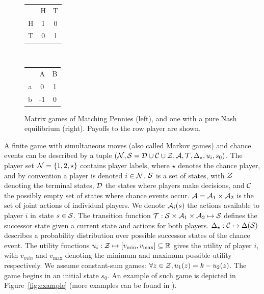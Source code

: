 

\begin{figure}[t!]
\centering
\begin{tabular}{c|c|c|}
 \multicolumn{1}{c}{~} & \multicolumn{1}{c}{H}  &  \multicolumn{1}{c}{T}\\\cline{2-3}
H &  1  &  0\\\cline{2-3}
T  & 0  &  1\\\cline{2-3}
\end{tabular}
~~~~~~~~~
\begin{tabular}{c|c|c|}
 \multicolumn{1}{c}{~} & \multicolumn{1}{c}{A}  &  \multicolumn{1}{c}{B}\\\cline{2-3}
a &  0  &  1\\\cline{2-3}
b & -1  &  0\\\cline{2-3}
\end{tabular}
\caption{Matrix games of Matching Pennies (left), and one with a pure Nash equilibrium (right).
Payoffs to the row player are shown. \label{fig:egMatrixGames}}
\end{figure}

A finite game with simultaneous moves (also called Markov games) and chance events can be described
by a tuple $(\mathcal{N}, \mathcal{S} = \mathcal{D}\cup\mathcal{C}\cup\mathcal{Z}, \mathcal{A}, \mathcal{T}, \Delta_\star, u_i, s_0)$.
The player set $\mathcal{N} = \{ 1, 2, \star \}$ contains player labels, where
$\star$ denotes the chance player, and by convention a player is denoted $i \in \mathcal{N}$.
$\mathcal{S}$ is a set of states, with $\mathcal{Z}$ denoting the terminal states, $\mathcal{D}$ the states where players make decisions,
and $\mathcal{C}$ the possibly empty set of states where chance events occur. $\mathcal{A} = \mathcal{A}_1 \times \mathcal{A}_2$ is the set of
joint actions of individual players. We denote $\mathcal{A}_i(s)$ the actions available to player $i$ in state $s \in \mathcal{S}$.
The transition function $\mathcal{T} : \mathcal{S} \times \mathcal{A}_1 \times \mathcal{A}_2 \mapsto \mathcal{S}$ defines the successor state given a current
state and actions for both players. $\Delta_\star:\mathcal{C} \mapsto \Delta(\mathcal{S})$ describes a probability distribution over
possible successor states of the chance event.
The utility functions $u_i : \mathcal{Z} \mapsto [v_{\min}, v_{\max}] \subseteq \mathbb{R}$ gives the utility of player $i$, with
$v_{min}$ and $v_{\max}$ denoting the minimum and maximum possible utility respectively. We assume constant-sum
games: $\forall z \in \mathcal{Z}, u_1(z) = k - u_2(z)$.
The game begins in an initial state $s_0$.
An example of such game is depicted in Figure~\ref{fig:example} (more examples can be found in \cite[Chapter 5]{Saffidine2013thesis}).

